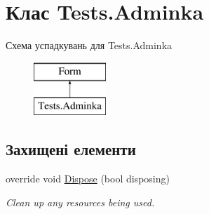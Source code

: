 \hypertarget{class_tests_1_1_adminka}{}\section{Клас Tests.\+Adminka}
\label{class_tests_1_1_adminka}
Схема успадкувань для Tests.\+Adminka\begin{figure}[H]
\begin{center}
\leavevmode
\includegraphics[height=2.000000cm]{class_tests_1_1_adminka}
\end{center}
\end{figure}
\subsection*{Захищені елементи}
\begin{DoxyCompactItemize}
\item 
override void \hyperlink{class_tests_1_1_adminka_ad10de447810a69558e83dcdb58681510}{Dispose} (bool disposing)
\begin{DoxyCompactList}\small\item\em Clean up any resources being used. \end{DoxyCompactList}\end{DoxyCompactItemize}
